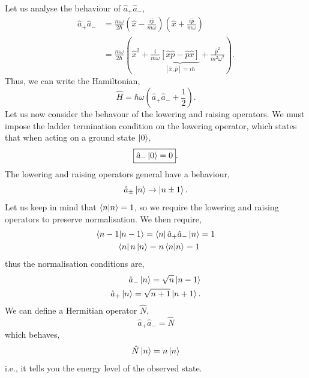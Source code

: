 \documentclass{book}
\begin{document}
Let us analyse the behaviour of $\hat{a}_+\hat{a}_-$,
\begin{equation}
	\begin{split}
		\hat{a}_+\hat{a}_- & = \frac{m\omega}{2\hbar} \left(\hat{x} - \frac{i\hat{p}}{m\omega}\right)\left(\hat{x} + \frac{i\hat{p}}{m\omega}\right) \\
		& = \frac{m\omega}{2\hbar} \left(\hat{x}^2 + \frac{i}{m\omega}\underbrace{\left[\hat{x}\hat{p} - \hat{p}\hat{x}\right]}_{\left[\hat{x},\hat{p}\right] = i\hbar} +\frac{\hat{p}^2}{m^2 \omega^2}\right).
	\end{split}
\end{equation}
Thus, we can write the Hamiltonian,
\begin{equation}
	\hat{H} = \hbar \omega \left(\hat{a}_+\hat{a}_- + \frac{1}{2}\right).
\end{equation}
Let us now consider the behavour of the lowering and raising operators. We must impose the ladder termination condition on the lowering operator, which states that when acting on a ground state $\ket{0}$,
\begin{equation}
	\boxed{\hat{a}_- \ket{0} = 0}.
\end{equation}
The lowering and raising operators general have a behaviour,
\begin{equation}
	\hat{a}_{\pm}\ket{n} \to \ket{n \pm 1}.
\end{equation}
Let us keep in mind that $\braket{n}{n} = 1$, so we require the lowering and raising operators to preserve normalisation. We then require,
\begin{equation}
	\begin{split}
		\braket{n-1}{n-1} = \bra{n}\hat{a}_+\hat{a}_-\ket{n} & = 1 \\
		\bra{n}n\ket{n} = n\braket{n}{n} = 1
	\end{split}
\end{equation}
thus the normalisation conditions are,
\begin{align}	
	\hat{a}_-\ket{n} = \sqrt{n}\ket{n-1} \\
	\hat{a}_+\ket{n} = \sqrt{n+1}\ket{n+1}.
\end{align}
We can define a Hermitian operator $\hat{N}$,
\begin{equation}
	\hat{a}_+\hat{a}_- =\hat{N}
\end{equation}
which behaves,
\begin{equation}
	\hat{N} \ket{n} = n \ket{n}
\end{equation}
i.e., it tells you the energy level of the observed state.
\end{document}
